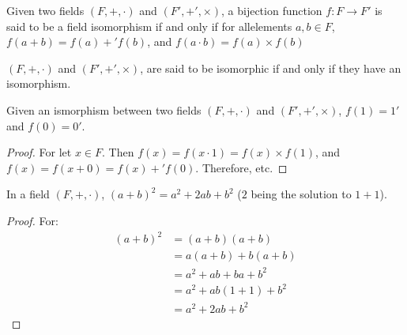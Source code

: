     \begin{definition}
        Given two fields $(F,+,\cdot)$ and $(F',+',\times)$, a bijection
        function $f:F\rightarrow{F}'$ is said to be a field isomorphism if and
        only if for allelements $a,b\in{F}$, $f(a+b)=f(a)+'f(b)$, and
        $f(a\cdot{b})=f(a)\times{f}(b)$
    \end{definition}
    \begin{definition}
        $(F,+,\cdot)$ and $(F',+',\times)$, are said to be isomorphic if and
        only if they have an isomorphism.
    \end{definition}
    \begin{theorem}
        Given an ismorphism between two fields $(F,+,\cdot)$ and
        $(F', +',\times)$, $f(1)=1'$ and $f(0)=0'$.
    \end{theorem}
    \begin{proof}
        For let $x\in{F}$. Then $f(x)=f(x\cdot 1)=f(x)\times{f}(1)$, and
        $f(x)=f(x+0)=f(x)+'f(0)$. Therefore, etc.
    \end{proof}
    \begin{theorem}
        In a field $(F,+,\cdot)$, $(a+b)^{2}=a^{2}+2ab+b^{2}$
        ($2$ being the solution to $1+1$).
    \end{theorem}
    \begin{proof}
        For:
        \begin{align}
            (a+b)^{2}&=(a+b)(a+b)\\
                     &=a(a+b)+b(a+b)\\
                     &=a^{2}+ab+ba+b^{2}\\
                     &=a^{2}+ab(1+1)+b^{2}\\
                     &=a^{2}+2ab+b^{2}
        \end{align}
    \end{proof}
